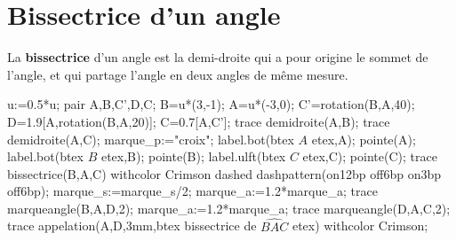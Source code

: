 \section{Bissectrice d'un angle}
\begin{changemargin}{0mm}{-25mm}
    \begin{definition}
        \begin{minipage}{0.6\linewidth}
        La \textbf{bissectrice} d'un angle est la demi-droite qui a pour origine le sommet de l'angle, et qui partage l'angle en deux angles de même mesure.
        \end{minipage}
        \hfill
        \begin{minipage}{0.4\linewidth}
            \begin{Geometrie}[CoinBG={(-2u,-u)},CoinHD={(4u,3u)}]
                u:=0.5*u;
                pair A,B,C',D,C;
                B=u*(3,-1);
                A=u*(-3,0);
                C'=rotation(B,A,40);
                D=1.9[A,rotation(B,A,20)];
                C=0.7[A,C'];
                trace demidroite(A,B);
                trace demidroite(A,C);
                marque_p:="croix";
                label.bot(btex $A$ etex,A);
                pointe(A);
                label.bot(btex $B$ etex,B);
                pointe(B);
                label.ulft(btex $C$ etex,C);
                pointe(C);
                trace bissectrice(B,A,C) withcolor Crimson dashed dashpattern(on12bp off6bp on3bp off6bp);
                marque_s:=marque_s/2;
                marque_a:=1.2*marque_a;
                trace marqueangle(B,A,D,2);
                marque_a:=1.2*marque_a;
                trace marqueangle(D,A,C,2);
                trace appelation(A,D,3mm,btex bissectrice de $\widehat{BAC}$ etex) withcolor Crimson;
            \end{Geometrie}
        \end{minipage}
    \end{definition}


\end{changemargin}
